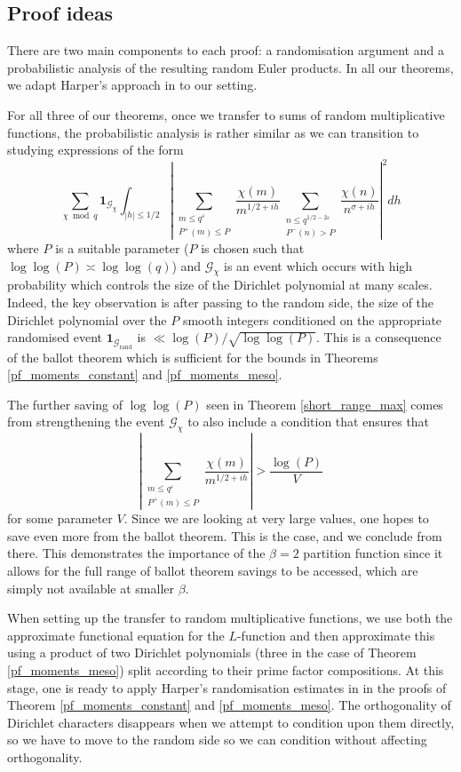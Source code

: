\documentclass[10pt,a4paper]{amsart}
\numberwithin{equation}{section}
\begin{document}
\subsection{Proof ideas}
There are two main components to each proof: a randomisation argument and a probabilistic analysis of the resulting random Euler products. In all our theorems, we adapt Harper's approach in \cite{harper2019partition} to our setting. \par
For all three of our theorems, once we transfer to sums of random multiplicative functions, the probabilistic analysis is rather similar as we can transition to studying expressions of the form
\begin{equation}\label{heuristic_quantity}
    \sum_{\chi \bmod{q}}\mathbf{1}_{\mathcal{G}_\chi}\int_{|h| \leq 1/2}|\sum_{\substack{m \leq q^{\varepsilon} \\ P^+(m) \leq P}}\frac{\chi(m)}{m^{1/2+ih}}\sum_{\substack{n \leq q^{1/2-2\varepsilon} \\ P^-(n) > P}}\frac{\chi(n)}{n^{\sigma+ih}}|^2dh
\end{equation}
where $P$ is a suitable parameter ($P$ is chosen such that $\log\log(P) \asymp \log\log(q)$) and $\mathcal{G}_\chi$ is an event which occurs with high probability which controls the size of the Dirichlet polynomial at many scales. Indeed, the key observation is after passing to the random side, the size of the Dirichlet polynomial over the $P$ smooth integers conditioned on the appropriate randomised event $\mathbf{1}_{\mathcal{G}_\text{rand}}$ is $\ll \log(P)/\sqrt{\log\log(P)}$. This is a consequence of the ballot theorem which is sufficient for the bounds in Theorems \ref{pf_moments_constant} and \ref{pf_moments_meso}.\par
The further saving of $\log\log(P)$ seen in Theorem \ref{short_range_max} comes from strengthening the event $\mathcal{G}_\chi$ to also include a condition that ensures that $$|\sum_{\substack{m \leq q^{\varepsilon} \\ P^+(m) \leq P}}\frac{\chi(m)}{m^{1/2+ih}}| > \frac{\log(P)}{V}$$
for some parameter $V$. Since we are looking at very large values, one hopes to save even more from the ballot theorem. This is the case, and we conclude from there. This demonstrates the importance of the $\beta=2$ partition function since it allows for the full range of ballot theorem savings to be accessed, which are simply not available at smaller $\beta$. \par
When setting up the transfer to random multiplicative functions, we use both the approximate functional equation for the $L$-function and then approximate this using a product of two Dirichlet polynomials (three in the case of Theorem \ref{pf_moments_meso}) split according to their prime factor compositions. At this stage, one is ready to apply Harper's randomisation estimates in \cite{harper2023typicalsizecharacterzeta} in the proofs of Theorem \ref{pf_moments_constant} and \ref{pf_moments_meso}. The orthogonality of Dirichlet characters disappears when we attempt to condition upon them directly, so we have to move to the random side so we can condition without affecting orthogonality. \par
\end{document}
